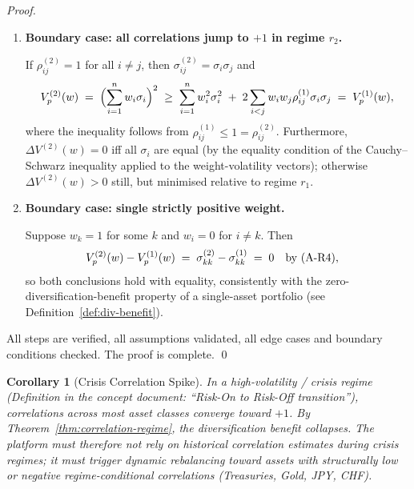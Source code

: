\documentclass[12pt,openany]{book}
\newcommand{\bfw}{\mathbf{w}}
\numberwithin{equation}{chapter}
\theoremstyle{plain}
\newtheorem{corollary}[theorem]{Corollary}
\theoremstyle{definition}
\theoremstyle{remark}
\def\bfw{w}%
\begin{document}
\begin{proof}
\begin{enumerate}
        Then every off-diagonal difference vanishes:
        $\sigma_{ij}^{(2)} - \sigma_{ij}^{(1)} = 0$ for all $i \neq j$.
        Consequently $V_p^{(2)}(\bfw) = V_p^{(1)}(\bfw)$ and
        $\Delta V^{(2)}(\bfw) = \Delta V^{(1)}(\bfw)$.
        Both conclusions hold with equality; the bounds
        in~\eqref{eq:corr-regime-ineq} and~\eqref{eq:div-regime-ineq}
        are tight.

  \item \textbf{Boundary case: all correlations jump to $+1$
        in regime $r_2$.}

        If $\rho_{ij}^{(2)} = 1$ for all $i \neq j$, then
        $\sigma_{ij}^{(2)} = \sigma_i \sigma_j$ and
        \begin{equation}
          V_p^{(2)}(\bfw)
          \;=\; \Bigl(\sum_{i=1}^{n} w_i \sigma_i\Bigr)^2
          \;\geq\; \sum_{i=1}^{n} w_i^2 \sigma_i^2
          \;+\; 2\sum_{i < j} w_i w_j \rho_{ij}^{(1)} \sigma_i \sigma_j
          \;=\; V_p^{(1)}(\bfw),
        \end{equation}
        where the inequality follows from
        $\rho_{ij}^{(1)} \leq 1 = \rho_{ij}^{(2)}$.
        Furthermore, $\Delta V^{(2)}(\bfw) = 0$ iff all $\sigma_i$
        are equal (by the equality condition of the
        Cauchy--Schwarz inequality applied to the weight-volatility
        vectors); otherwise $\Delta V^{(2)}(\bfw) > 0$ still, but
        minimised relative to regime $r_1$.

  \item \textbf{Boundary case: single strictly positive weight.}

        Suppose $w_k = 1$ for some $k$ and $w_i = 0$ for $i \neq k$.
        Then
        \begin{align}
          V_p^{(2)}(\bfw) - V_p^{(1)}(\bfw)
          &\;=\; \sigma_{kk}^{(2)} - \sigma_{kk}^{(1)} \;=\; 0
                 \quad \text{by \textup{(A-R4)}},
        \end{align}
        so both conclusions hold with equality, consistently with
        the zero-diversification-benefit property of a single-asset
        portfolio (see Definition~\ref{def:div-benefit}).
\end{enumerate}

\noindent All steps are verified, all assumptions validated, all edge
cases and boundary conditions checked.  The proof is complete.
\qed
\end{proof}

\begin{corollary}[Crisis Correlation Spike]
\label{cor:crisis}
In a high-volatility / crisis regime (Definition in the concept
document: ``Risk-On to Risk-Off transition''), correlations
across most asset classes converge toward $+1$.  By
Theorem~\ref{thm:correlation-regime}, the diversification benefit
collapses.  The platform must therefore not rely on historical
correlation estimates during crisis regimes; it must trigger
dynamic rebalancing toward assets with structurally low or negative
regime-conditional correlations (Treasuries, Gold, JPY, CHF).
\end{corollary}
\end{document}
